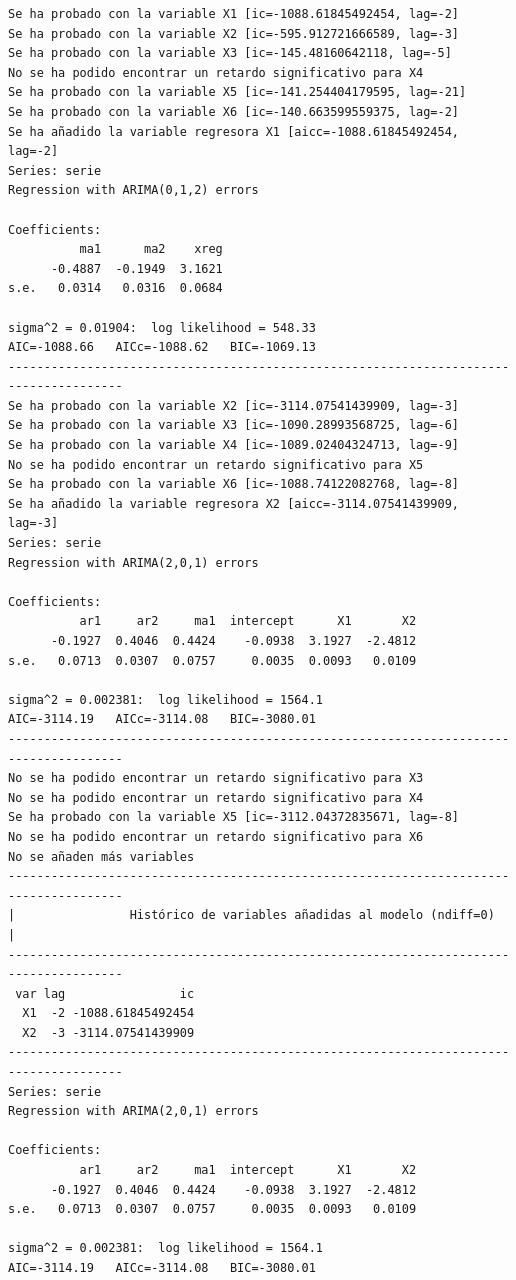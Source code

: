 \documentclass[
  12pt,
  a4paper]{article}
\begin{document}
\begin{verbatim}
Se ha probado con la variable X1 [ic=-1088.61845492454, lag=-2]
Se ha probado con la variable X2 [ic=-595.912721666589, lag=-3]
Se ha probado con la variable X3 [ic=-145.48160642118, lag=-5]
No se ha podido encontrar un retardo significativo para X4
Se ha probado con la variable X5 [ic=-141.254404179595, lag=-21]
Se ha probado con la variable X6 [ic=-140.663599559375, lag=-2]
Se ha añadido la variable regresora X1 [aicc=-1088.61845492454, lag=-2]
Series: serie 
Regression with ARIMA(0,1,2) errors 

Coefficients:
          ma1      ma2    xreg
      -0.4887  -0.1949  3.1621
s.e.   0.0314   0.0316  0.0684

sigma^2 = 0.01904:  log likelihood = 548.33
AIC=-1088.66   AICc=-1088.62   BIC=-1069.13
--------------------------------------------------------------------------------------
Se ha probado con la variable X2 [ic=-3114.07541439909, lag=-3]
Se ha probado con la variable X3 [ic=-1090.28993568725, lag=-6]
Se ha probado con la variable X4 [ic=-1089.02404324713, lag=-9]
No se ha podido encontrar un retardo significativo para X5
Se ha probado con la variable X6 [ic=-1088.74122082768, lag=-8]
Se ha añadido la variable regresora X2 [aicc=-3114.07541439909, lag=-3]
Series: serie 
Regression with ARIMA(2,0,1) errors 

Coefficients:
          ar1     ar2     ma1  intercept      X1       X2
      -0.1927  0.4046  0.4424    -0.0938  3.1927  -2.4812
s.e.   0.0713  0.0307  0.0757     0.0035  0.0093   0.0109

sigma^2 = 0.002381:  log likelihood = 1564.1
AIC=-3114.19   AICc=-3114.08   BIC=-3080.01
--------------------------------------------------------------------------------------
No se ha podido encontrar un retardo significativo para X3
No se ha podido encontrar un retardo significativo para X4
Se ha probado con la variable X5 [ic=-3112.04372835671, lag=-8]
No se ha podido encontrar un retardo significativo para X6
No se añaden más variables
--------------------------------------------------------------------------------------
|                Histórico de variables añadidas al modelo (ndiff=0)                 |
--------------------------------------------------------------------------------------
 var lag                ic
  X1  -2 -1088.61845492454
  X2  -3 -3114.07541439909
--------------------------------------------------------------------------------------
Series: serie 
Regression with ARIMA(2,0,1) errors 

Coefficients:
          ar1     ar2     ma1  intercept      X1       X2
      -0.1927  0.4046  0.4424    -0.0938  3.1927  -2.4812
s.e.   0.0713  0.0307  0.0757     0.0035  0.0093   0.0109

sigma^2 = 0.002381:  log likelihood = 1564.1
AIC=-3114.19   AICc=-3114.08   BIC=-3080.01
\end{verbatim}
\end{document}
